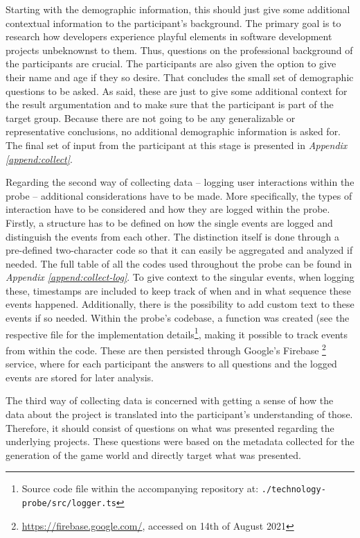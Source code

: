 Starting with the demographic information, this should just give some additional contextual information to the participant's background. The primary goal is to research how developers experience playful elements in software development projects unbeknownst to them. Thus, questions on the professional background of the participants are crucial. The participants are also given the option to give their name and age if they so desire. That concludes the small set of demographic questions to be asked. As said, these are just to give some additional context for the result argumentation and to make sure that the participant is part of the target group. Because there are not going to be any generalizable or representative conclusions, no additional demographic information is asked for. The final set of input from the participant at this stage is presented in \textit{Appendix \ref{append:collect}}.

Regarding the second way of collecting data -- logging user interactions within the probe -- additional considerations have to be made. More specifically, the types of interaction have to be considered and how they are logged within the probe. Firstly, a structure has to be defined on how the single events are logged and distinguish the events from each other. The distinction itself is done through a pre-defined two-character code so that it can easily be aggregated and analyzed if needed. The full table of all the codes used throughout the probe can be found in \textit{Appendix \ref{append:collect-log}}. To give context to the singular events, when logging these, timestamps are included to keep track of when and in what sequence these events happened. Additionally, there is the possibility to add custom text to these events if so needed. Within the probe's codebase, a function was created (see the respective file for the implementation details\footnote{Source code file within the accompanying repository at: \texttt{./technology-probe/src/logger.ts}}, making it possible to track events from within the code. These are then persisted through Google's Firebase \footnote{\url{https://firebase.google.com/}, accessed on 14th of August 2021} service, where for each participant the answers to all questions and the logged events are stored for later analysis.

The third way of collecting data is concerned with getting a sense of how the data about the project is translated into the participant's understanding of those. Therefore, it should consist of questions on what was presented regarding the underlying projects. These questions were based on the metadata collected for the generation of the game world and directly target what was presented.

